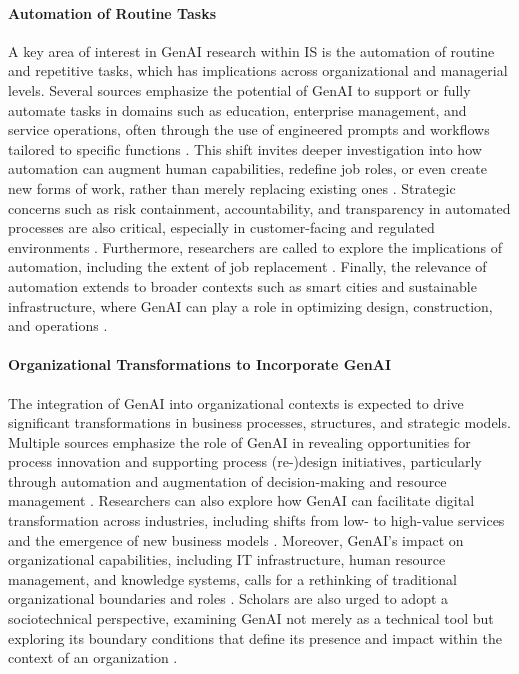 \paragraph{Automation of Routine Tasks}
A key area of interest in GenAI research within IS is the automation of routine and repetitive tasks, which has implications across organizational and managerial levels. Several sources emphasize the potential of GenAI to support or fully automate tasks in domains such as  education, enterprise management, and service operations, often through the use of engineered prompts and workflows tailored to specific functions \parencite{R02, R04, R08}. This shift invites deeper investigation into how automation can augment human capabilities, redefine job roles, or even create new forms of work, rather than merely replacing existing ones \parencite{R05}. Strategic concerns such as risk containment, accountability, and transparency in automated processes are also critical, especially in customer-facing and regulated environments \parencite{R05, R08}. Furthermore, researchers are called to explore the implications of automation, including the extent of job replacement \parencite{R10}. Finally, the relevance of automation extends to broader contexts such as smart cities and sustainable infrastructure, where GenAI can play a role in optimizing design, construction, and operations \parencite{S15}.

\paragraph{Organizational Transformations to Incorporate GenAI}
The integration of GenAI into organizational contexts is expected to drive significant transformations in business processes, structures, and strategic models. Multiple sources emphasize the role of GenAI in revealing opportunities for process innovation and supporting process (re-)\hspace{0pt}design initiatives, particularly through automation and augmentation of decision-making and resource management \parencite{R04, R07, R08}. Researchers can also explore how GenAI can facilitate digital transformation across industries, including shifts from low- to high-value services and the emergence of new business models \parencite{R07, R08}. Moreover, GenAI’s impact on organizational capabilities, including IT infrastructure, human resource management, and knowledge systems, calls for a rethinking of traditional organizational boundaries and roles \parencite{R07, R10}. Scholars are also urged to adopt a sociotechnical perspective, examining GenAI not merely as a technical tool but exploring its boundary conditions that define its presence and impact within the context of an organization \parencite{R10}.

